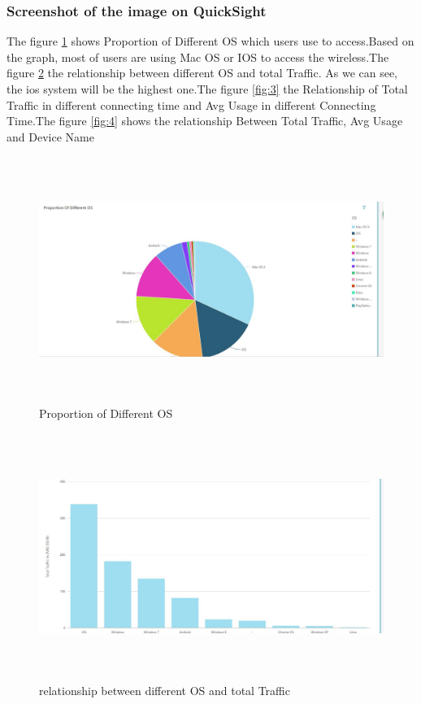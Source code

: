     \subsubsection{Screenshot of the image on QuickSight}
    The figure \ref{fig:1} shows Proportion of Different OS which users use to access.Based on the graph, most of users are using Mac OS or IOS to access the wireless.The figure \ref{fig:2} the relationship between different OS and total Traffic. As we can see, the ios system will be the highest one.The figure \ref{fig:3} the Relationship of Total Traffic in different connecting time and Avg Usage in different Connecting Time.The figure \ref{fig:4} shows the relationship Between Total Traffic, Avg Usage and Device Name
 \begin{figure}[H]
 \includegraphics[width=17cm, height=8cm]{1.jpg}
 \centering
 \caption{\label{fig:1}Proportion of Different OS}
 \end{figure}
 
 \begin{figure}[H]
 \includegraphics[width=17cm, height=8cm]{2.jpg}
 \centering
 \caption{\label{fig:2}relationship between different OS and total Traffic}
 \end{figure}

